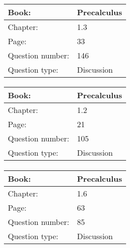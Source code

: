 \documentclass{article}
\begin{document}
            \paragraph{}
            \begin{tabularx}{1\textwidth}{
                    p{}
                    p{}
                }
                \toprule
                Book: & Precalculus
                \\
                \midrule
                Chapter: & 1.3
                \\
                \midrule
                Page: & 33
                \\
                \midrule
                Question number: & 146
                \\
                \midrule
                Question type: & Discussion
                \\
                \bottomrule
            \end{tabularx}
            
            \paragraph{}
            \begin{tabularx}{1\textwidth}{
                    p{}
                    p{}
                }
                \toprule
                Book: & Precalculus
                \\
                \midrule
                Chapter: & 1.2
                \\
                \midrule
                Page: & 21
                \\
                \midrule
                Question number: & 105
                \\
                \midrule
                Question type: & Discussion
                \\
                \bottomrule
            \end{tabularx}
            
            \paragraph{}
            \begin{tabularx}{1\textwidth}{
                    p{}
                    p{}
                }
                \toprule
                Book: & Precalculus
                \\
                \midrule
                Chapter: & 1.6
                \\
                \midrule
                Page: & 63
                \\
                \midrule
                Question number: & 85
                \\
                \midrule
                Question type: & Discussion
                \\
                \bottomrule
            \end{tabularx}
            
\end{document}
